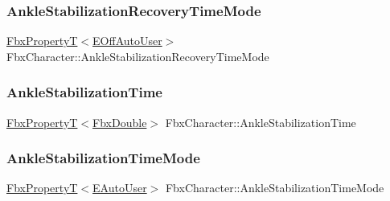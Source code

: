 \mbox{\label{class_fbx_character_a2e7887fe49c1f8dfadabff2a882a94de}} 
\subsubsection{\texorpdfstring{Ankle\+Stabilization\+Recovery\+Time\+Mode}{AnkleStabilizationRecoveryTimeMode}}
{\footnotesize\ttfamily \hyperlink{class_fbx_property_t}{Fbx\+PropertyT}$<$\hyperlink{class_fbx_character_ab698a180e6f900ba8317257749c2ecce}{E\+Off\+Auto\+User}$>$ Fbx\+Character\+::\+Ankle\+Stabilization\+Recovery\+Time\+Mode}

\mbox{\label{class_fbx_character_a68bd7769c89201b7f652189a581585bc}} 
\subsubsection{\texorpdfstring{Ankle\+Stabilization\+Time}{AnkleStabilizationTime}}
{\footnotesize\ttfamily \hyperlink{class_fbx_property_t}{Fbx\+PropertyT}$<$\hyperlink{fbxtypes_8h_a171e72a1c46fc15c1a6c9c31948c1c5b}{Fbx\+Double}$>$ Fbx\+Character\+::\+Ankle\+Stabilization\+Time}

\mbox{\label{class_fbx_character_a3153af9c5fe1f2cd48022ccc4cfed804}} 
\subsubsection{\texorpdfstring{Ankle\+Stabilization\+Time\+Mode}{AnkleStabilizationTimeMode}}
{\footnotesize\ttfamily \hyperlink{class_fbx_property_t}{Fbx\+PropertyT}$<$\hyperlink{class_fbx_character_a5b03462709a82a15d89ee4563a4c49df}{E\+Auto\+User}$>$ Fbx\+Character\+::\+Ankle\+Stabilization\+Time\+Mode}

